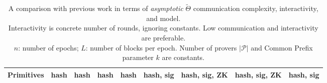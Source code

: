 \begin{table*}[t]
\begin{tabular}{|l|r|r|r|r|r|r|r|r|}
  \textbf{Primitives}                            & hash                             & hash                             & hash                                  & hash                                          & hash, sig                          & hash, sig, ZK                   & hash, sig, ZK              & hash, sig                  \\ \hline
  \end{tabular}
  \vspace{0.5em}
  \caption{A comparison with previous work in terms of \emph{asymptotic} $\widetilde{\Theta}$ communication complexity, interactivity, and model.\\
           Interactivity is concrete number of rounds, ignoring constants. Low communication and interactivity are preferable.\\
           $n$: number of epochs; $L$: number of blocks per epoch.
           Number of provers $|\mathcal{P}|$ and Common Prefix parameter $k$ are constants.}
  \label{tab.comparison}
\end{table*}

